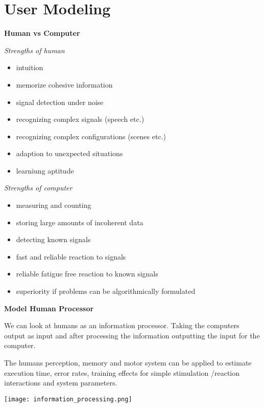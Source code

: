 \section{User Modeling}

\textbf{Human vs Computer}

\textit{Strengths of human} \medskip

\begin{itemize}[itemsep=-5pt, topsep=0pt, leftmargin=*]
    \item intuition
    \item memorize cohesive information
    \item signal detection under noise
    \item recognizing complex signals (speech etc.)
    \item recognizing complex configurations (scenes etc.)
    \item adaption to unexpected situations
    \item learniung aptitude
\end{itemize}

\medskip


\textit{Strengths of computer} \medskip

\begin{itemize}[itemsep=-5pt, topsep=0pt, leftmargin=*]
    \item measuring and counting
    \item storing large amounts of incoherent data
    \item detecting known signals
    \item fast and reliable reaction to signals
    \item reliable fatigue free reaction to known signals
    \item superiority if problems can be algorithmically formulated
\end{itemize}

\medskip

\textbf{Model Human Processor} \smallskip


We can look at humans as an information processor. Taking the computers output as input and after processing the information outputting the input for the computer. \smallskip

The humans perception, memory and motor system can be applied to estimate execution time, error rates, training effects for simple stimulation /reaction interactions and system parameters. \smallskip

\begin{center}
	\texttt{[image: information\_processing.png]}
\end{center}


